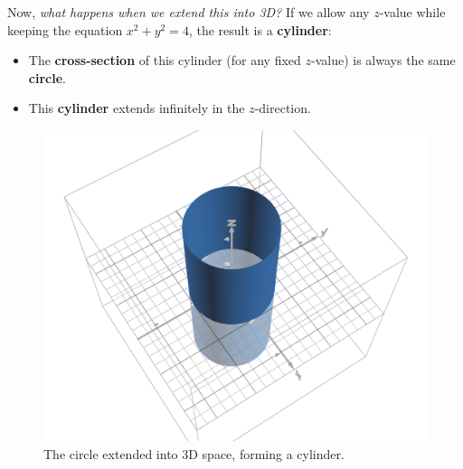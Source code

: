 \documentclass{article}
\begin{document}
\begin{examplebox}
\bigskip
\bigskip

Now, \textit{what happens when we extend this into 3D?}  
If we allow any \( z \)-value while keeping the equation \( x^2 + y^2 = 4 \), the result is a \textbf{cylinder}:

\begin{minipage}{0.55\textwidth}
    \vspace{1em}
    \begin{itemize}
        \item The \textbf{cross-section} of this cylinder (for any fixed \( z \)-value) is always the same \textbf{circle}.
        \item This \textbf{cylinder} extends infinitely in the \( z \)-direction.
    \end{itemize}
    \vspace{1em}
\end{minipage}
\begin{minipage}{0.4\textwidth}
    \begin{figure}[H]
        \centering
        \includegraphics[width=\textwidth]{x^2 + y^2 = 4 in 3D.png}
        \caption{The circle extended into 3D space, forming a cylinder.}
        \label{fig:cylinder_3d}
    \end{figure}
\end{minipage}

\end{examplebox}
\end{document}
